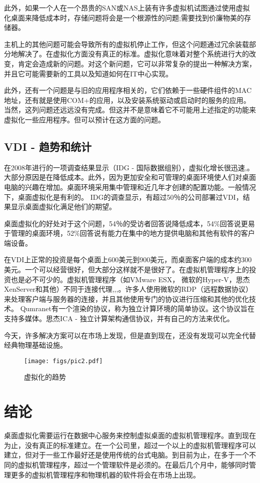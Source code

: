 \documentclass[10pt,a4paper]{article}
\begin{document}
\begin{CJK*}{UTF8}{gkai}
此外，如果一个人在一个昂贵的SAN或NAS上装有许多虚拟机试图通过使用虚拟化桌面来降低成本时，存储问题将会是一个根源性的问题;需要找到价廉物美的存储器。 


主机上的其他问题可能会导致所有的虚拟机停止工作，但这个问题通过冗余装载部分地解决了。在虚拟化方面没有真正的标准。虚拟化意味着对整个系统进行大的改变，肯定会造成新的问题。对这个新问题，它可以非常复杂的提出一种解决方案，并且它可能需要新的工具以及知道如何在IT中心实现。 


此外，还有一个问题是与旧的应用程序相关的，它们依赖于一些硬件组件的MAC地址，还有就是使用COM+的应用，以及安装系统驱动或启动时的服务的应用。当然，这列问题还远远没有完成。但这并不是意味着它不可能用上述指定的功能来虚拟化一些应用程序。但可以预计在这方面的问题。


\subsection{VDI - 趋势和统计}
在2008年进行的一项调查结果显示（IDG - 国际数据组别），虚拟化增长很迅速\cite{7},\cite{9}。 大部分原因是在降低成本。此外，因为更加安全和可管理的桌面环境使人们对桌面电脑的兴趣在增加。桌面环境采用集中管理和近几年才创建的配置功能。一般情况下，桌面虚拟化是有利的。 IDG的调查显示，有超过50％的公司部署过VDI，结果显示桌面虚拟化满足他们的期望。 


桌面虚拟化的好处对于这个问题，54％的受访者回答说降低成本，54\%回答说更易于管理的桌面环境，52\%回答说有能力在集中的地方提供电脑和其他有软件的客户端设备。 


在VDI上正常的投资是每个桌面上600美元到900美元，而桌面客户端的成本约300美元。一个可以经营很好，但大部分这样就不是很好了。在虚拟机管理程序上的投资也是必不可少的。虚拟机管理程序（如VMware ESX， 微软的Hyper-V，思杰XenServer和其他）不同于连接代理\cite{1},\cite{2},\cite{4},\cite{6}。许多人使用微软的RDP（远程数据协议）来处理客户端与服务器的连接，并且其他使用专门的协议进行压缩和其他的优化技术\cite{2}。 Qumranet有一个渲染的协议，称为独立计算环境的简单协议。这个协议旨在支持多媒体。思杰ICA - 独立计算架构通信协议，并有自己的方法来优化。 


今天，许多解决方案可以在市场上发现，但是直到现在，还没有发现可以完全代替经典物理基础设施。
\begin{figure}[!htbp]
	\centering
	\caption{虚拟化的趋势}
    	\texttt{[image: figs/pic2.pdf]}
    \label{fig:subfig4}
\end{figure}


\section{结论}
桌面虚拟化需要运行在数据中心服务来控制虚拟桌面的虚拟机管理程序。直到现在为止，没有真正的标准建立。在一个公司里，超过一个以上的虚拟机管理程序可以建立，但对于一些工作最好还是使用传统的台式电脑。到目前为止，在多于一个不同的虚拟机管理程序，超过一个管理软件是必须的。在最后几个月中，能够同时管理更多的虚拟机管理程序和物理机器的软件将会在市场上出现。 



\end{CJK*}
\end{document}
